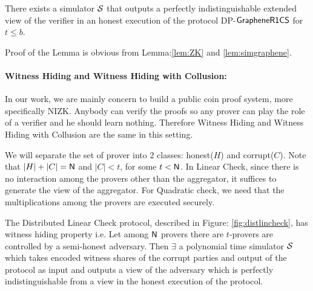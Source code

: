 \begin{lemma}\label{lem:simdpgraphene}
	There exists a simulator $\mathcal{S}$ that outputs a perfectly indistinguishable extended view of the verifier in an honest execution of the protocol DP-$\mathsf{GrapheneR1CS}$ for $t\leq b$.
\end{lemma}

Proof of the Lemma is obvious from Lemma:\ref{lem:ZK} and \ref{lem:simgraphene}.

\paragraph{Witness Hiding and Witness Hiding with Collusion:} In our work, we are mainly concern to build a public coin proof system, more specifically NIZK. Anybody can verify the proofs so any prover can play the role of a verifier and he should learn nothing. Therefore Witness Hiding and Witness Hiding with Collusion are the same in this setting. 

We will separate the set of prover into 2 classes: honest($H$) and corrupt($C$). Note that $|H|+|C|=\mathsf{N}$ and $|C|<t$, for some $t<\mathsf{N}$. In Linear Check, since there is no interaction among the provers other than the aggregator, it suffices to generate the view of the aggregator. For Quadratic check, we need that the multiplications among the provers are executed securely. 

\begin{lemma}\label{lem:WHlin}
	The Distributed Linear Check protocol, described in Figure: \ref{fig:distlincheck}, has witness hiding property i.e. Let among $\mathsf{N}$ provers there are $t$-provers are controlled by a semi-honest adversary. Then $\exists$ a polynomial time simulator $\mathcal{S}$ which takes encoded witness shares of the corrupt parties and output of the protocol as input and outputs a view of the adversary which is perfectly indistinguishable from a view in the honest execution of the protocol.
\end{lemma}

